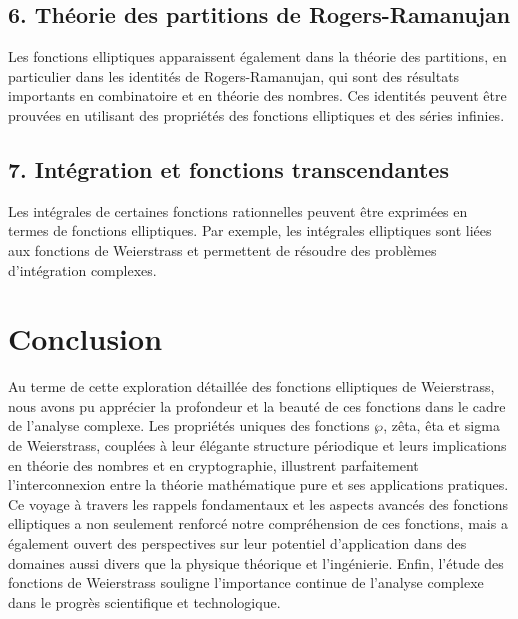\documentclass[12pt]{article}
\begin{document}
                        \subsection*{6. Théorie des partitions de Rogers-Ramanujan}
                        
                        Les fonctions elliptiques apparaissent également dans la théorie des partitions, en particulier dans les identités de Rogers-Ramanujan, qui sont des résultats importants en combinatoire et en théorie des nombres. Ces identités peuvent être prouvées en utilisant des propriétés des fonctions elliptiques et des séries infinies.
                        
                        \subsection*{7. Intégration et fonctions transcendantes}
                        
                        Les intégrales de certaines fonctions rationnelles peuvent être exprimées en termes de fonctions elliptiques. Par exemple, les intégrales elliptiques sont liées aux fonctions de Weierstrass et permettent de résoudre des problèmes d'intégration complexes.

                        

                        \newpage
                        \section*{Conclusion}

            Au terme de cette exploration détaillée des fonctions elliptiques de Weierstrass, nous avons pu apprécier la profondeur et la beauté de ces
            fonctions dans le cadre de l'analyse complexe. Les propriétés uniques des fonctions $\wp$, zêta, êta et sigma de Weierstrass, couplées à leur élégante
            structure périodique et leurs implications en théorie des nombres et en cryptographie, illustrent parfaitement l'interconnexion entre la théorie 
            mathématique pure et ses applications pratiques. Ce voyage à travers les rappels fondamentaux et les aspects avancés des fonctions elliptiques a 
            non seulement renforcé notre compréhension de ces fonctions, mais a également ouvert des perspectives sur leur potentiel d'application dans des
            domaines aussi divers que la physique théorique et l'ingénierie. Enfin, l'étude des fonctions de Weierstrass souligne l'importance continue de
            l'analyse complexe dans le progrès scientifique et technologique.
            \newpage
\end{document}
